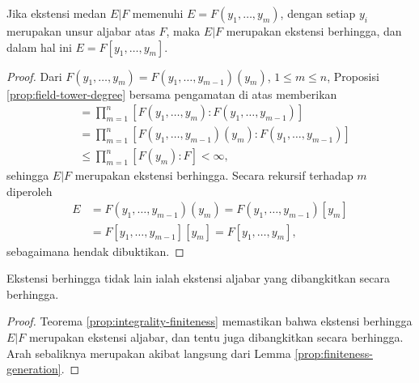 \begin{lemma}\label{prop:finiteness-generation}
	Jika ekstensi medan $E|F$ memenuhi $E=F(y_1, \ldots, y_m)$, dengan setiap $y_i$ merupakan unsur aljabar atas $F$, maka $E|F$ merupakan ekstensi berhingga, dan dalam hal ini $E=F[y_1, \ldots, y_m]$.
\end{lemma}
\begin{proof}
	Dari $F(y_1, \ldots, y_m) = F(y_1, \ldots, y_{m-1})(y_m)$, $1 \leq m \leq n$, Proposisi \ref{prop:field-tower-degree} bersama pengamatan di atas memberikan
	\begin{align*}
		[F(y_1, \ldots, y_n):F] & = \prod_{m=1}^n \left[ F(y_1, \ldots, y_m): F(y_1, \ldots, y_{m-1}) \right] \\
		& = \prod_{m=1}^n \left[ F(y_1, \ldots, y_{m-1})(y_m): F(y_1, \ldots, y_{m-1}) \right] \\
		& \leq \prod_{m=1}^n [F(y_m):F] < \infty,
	\end{align*}
	sehingga $E|F$ merupakan ekstensi berhingga. Secara rekursif terhadap $m$ diperoleh
	\begin{equation*}\begin{aligned}
		E & = F(y_1, \ldots, y_{m-1})(y_m) = F(y_1, \ldots, y_{m-1})[y_m] \\
		& = F[y_1, \ldots, y_{m-1}][y_m] = F[y_1, \ldots, y_m],
	\end{aligned}\end{equation*}
	sebagaimana hendak dibuktikan.
\end{proof}

\begin{lemma}\label{prop:finite-vs-algebraic}
	Ekstensi berhingga tidak lain ialah ekstensi aljabar yang dibangkitkan secara berhingga.
\end{lemma}
\begin{proof}
	Teorema \ref{prop:integrality-finiteness} memastikan bahwa ekstensi berhingga $E|F$ merupakan ekstensi aljabar, dan tentu juga dibangkitkan secara berhingga. Arah sebaliknya merupakan akibat langsung dari Lemma \ref{prop:finiteness-generation}.
\end{proof}

